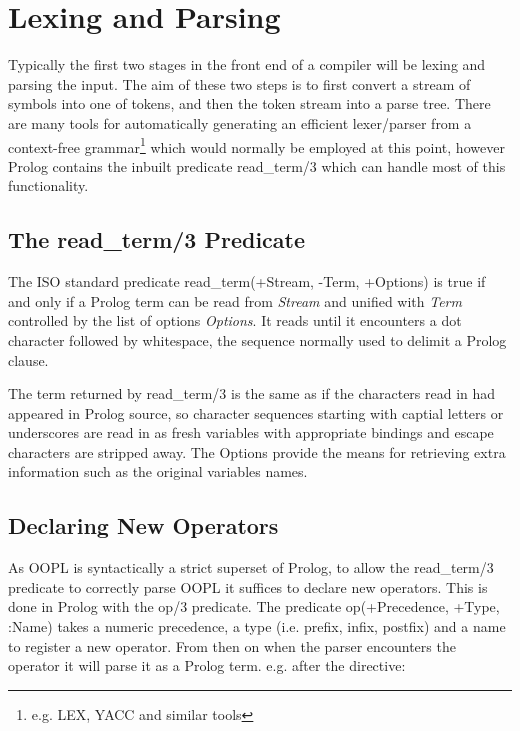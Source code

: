 \documentclass[12pt,a4paper,twoside,openright]{report}
\begin{document}
\section{Lexing and Parsing}

Typically the first two stages in the front end of a compiler will be lexing and parsing the input\cite{DRAGON}. The aim of these two steps is to first convert a stream of symbols into one of tokens, and then the token stream into a parse tree. There are many tools for automatically generating an efficient lexer/parser from a context-free grammar\footnote{e.g. LEX, YACC and similar tools} which would normally be employed at this point, however Prolog contains the inbuilt predicate read_term/3 which can handle most of this functionality.

\subsection{The read_term/3 Predicate}

The ISO standard\cite{ISOPROLOG} predicate read_term(+Stream, -Term, +Options) is true if and only if a Prolog term can be read from \emph{Stream} and unified with \emph{Term} controlled by the list of options \emph{Options}. It reads until it encounters a dot character followed by whitespace, the sequence normally used to delimit a Prolog clause.

\bigskip

The term returned by read_term/3 is the same as if the characters read in had appeared in Prolog source, so character sequences starting with captial letters or underscores are read in as fresh variables with appropriate bindings and escape characters are stripped away. The Options provide the means for retrieving extra information such as the original variables names.

\subsection{Declaring New Operators}

As OOPL is syntactically a strict superset of Prolog, to allow the read_term/3 predicate to correctly parse OOPL it suffices to declare new operators. This is done in Prolog with the op/3 predicate. The predicate op(+Precedence, +Type, :Name) takes a numeric precedence, a type (i.e. prefix, infix, postfix) and a name to register a new operator. From then on when the parser encounters the operator it will parse it as a Prolog term. e.g. after the directive:
\end{document}
